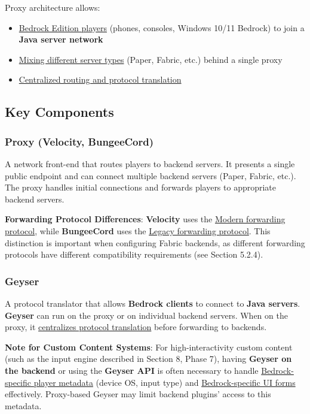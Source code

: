 \documentclass{article}
\begin{document}
Proxy architecture allows:
\begin{itemize}
    \item \uline{Bedrock Edition players} (phones, consoles, Windows 10/11 Bedrock) to join a \textbf{Java server network}
    \item \uline{Mixing different server types} (Paper, Fabric, etc.) behind a single proxy
    \item \uline{Centralized routing and protocol translation}
\end{itemize}

\subsection{Key Components}

\subsubsection{Proxy (Velocity, BungeeCord)}

A network front-end that routes players to backend servers. It presents a single public endpoint and can connect multiple backend servers (Paper, Fabric, etc.). The proxy handles initial connections and forwards players to appropriate backend servers.

\textbf{Forwarding Protocol Differences}: \textbf{Velocity} uses the \uline{Modern forwarding protocol}, while \textbf{BungeeCord} uses the \uline{Legacy forwarding protocol}. This distinction is important when configuring Fabric backends, as different forwarding protocols have different compatibility requirements (see Section 5.2.4).

\subsubsection{Geyser}

A protocol translator that allows \textbf{Bedrock clients} to connect to \textbf{Java servers}. \textbf{Geyser} can run on the proxy or on individual backend servers. When on the proxy, it \uline{centralizes protocol translation} before forwarding to backends.

\textbf{Note for Custom Content Systems}: For high-interactivity custom content (such as the input engine described in Section 8, Phase 7), having \textbf{Geyser on the backend} or using the \textbf{Geyser API} is often necessary to handle \uline{Bedrock-specific player metadata} (device OS, input type) and \uline{Bedrock-specific UI forms} effectively. Proxy-based Geyser may limit backend plugins' access to this metadata.
\end{document}
